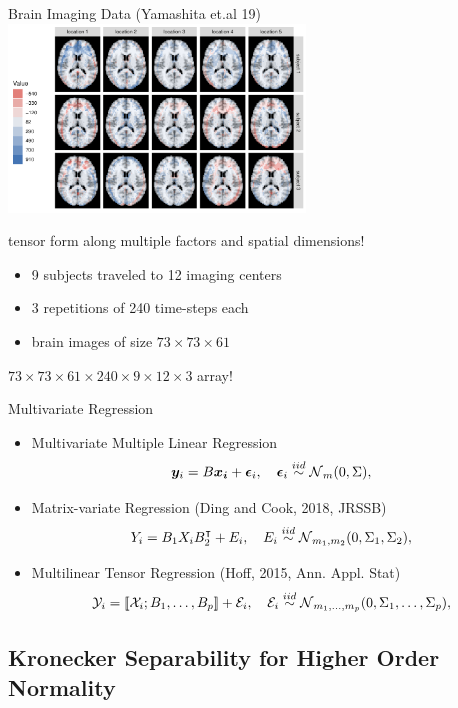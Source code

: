 \documentclass{beamer}
\begin{document}
\begin{frame}{Brain Imaging Data (Yamashita et.al 19)}
  \centering
  \includegraphics[height = 5cm]{figures/traveling-subjects.png}
  
tensor form along multiple factors and spatial dimensions!
\begin{itemize}
\item 9 subjects traveled to 12 imaging centers
\item 3 repetitions of  240 time-steps each
\item brain images of size $73\times 73\times 61$
\end{itemize}
$73\times 73\times 61\times 240\times 9\times 12\times 3$ array!
\end{frame}



\begin{frame}{Multivariate Regression}
	\begin{itemize}
			\item Multivariate Multiple Linear Regression
			$$ \bm{y}_i = B \bm{x_i} + \boldsymbol{\epsilon}_i, \quad \boldsymbol{\epsilon}_i \overset{iid}{\sim} \operatorname{\mathcal N}_m(0,\Sigma),$$
\item Matrix-variate Regression (Ding and Cook, 2018, JRSSB)
			$$ Y_i = B_1 X_i B_2^\intercal + E_i, \quad E_i \overset{iid}{\sim} \operatorname{\mathcal N}_{m_1,m_2}(0,\Sigma_1,\Sigma_2),$$
\item Multilinear Tensor Regression  (Hoff, 2015,  Ann. Appl. Stat)
$$
 \mathcal Y_i = [\![ \mathcal X_i; B_1, \hdots,B_p  ]\!]	+\mathcal E_i
, \quad \mathcal E_i \overset{iid}{\sim} 
\operatorname{\mathcal N}_{m_1, \hdots, m_p}(0,\Sigma_1,\hdots, \Sigma_p),
$$
\end{itemize}
\end{frame}
\subsection{Kronecker Separability for Higher Order Normality}
\end{document}
